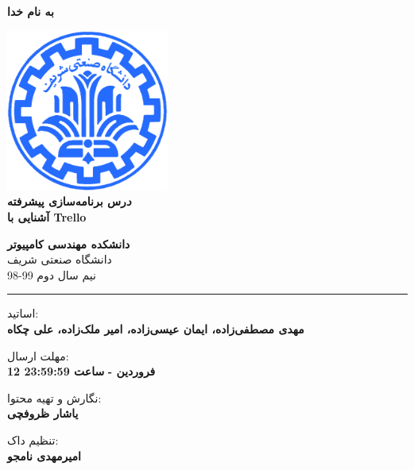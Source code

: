 \documentclass[]{article}
\begin{document}
\begin{titlepage}
\begin{center}

\textbf{ \Huge{به نام خدا} }
        
\vspace{0.2cm}

\includegraphics[width=0.4\textwidth]{sharif1.png}\\
\vspace{0.2cm}
\textbf{ \Huge{\emph درس برنامه‌سازی پیشرفته} }\\
\vspace{0.25cm}
\textbf{ \Large{ آشنایی با Trello} }
\vspace{0.2cm}
       
 
      \large \textbf{دانشکده مهندسی کامپیوتر}\\\vspace{0.1cm}
    \large   دانشگاه صنعتی شریف\\\vspace{0.2cm}
       \large   ﻧﯿﻢ سال دوم 99-98 \\\vspace{0.10cm}
      \noindent\rule[1ex]{\linewidth}{1pt}
اساتید:\\
    \textbf{{مهدی مصطفی‌زاده، ایمان عیسی‌زاده، امیر ملک‌زاده، علی چکاه}}



    \vspace{0.20cm}

   مهلت ارسال:\\
    \textbf{{12 فروردین - }}
    \textbf{{ساعت 23:59:59}}


        \vspace{0.10cm}
نگارش و تهیه محتوا:\\
    \textbf{{یاشار ظروفچی}}
    
       \vspace{0.10cm}
       تنظیم داک:\\
    \textbf{{امیرمهدی نامجو}}

    
        \vspace{0.05cm}

\end{center}
\end{titlepage}
\end{document}
